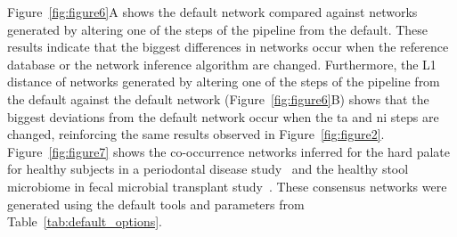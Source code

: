   Figure~\ref{fig:figure6}A shows the default network compared against networks generated by altering one of the steps of the pipeline from the default.
  These results indicate that the biggest differences in networks occur when the reference database or the network inference algorithm are changed.
  Furthermore, the L1 distance of networks generated by altering one of the steps of the pipeline from the default against the default network (Figure~\ref{fig:figure6}B) shows that the biggest deviations from the default network occur when the \ac{ta} and \ac{ni} steps are changed, reinforcing the same results observed in Figure~\ref{fig:figure2}. Figure~\ref{fig:figure7} shows the co-occurrence networks inferred for the hard palate for healthy subjects in a periodontal disease study~\cite{Chen2018} and the healthy stool microbiome in fecal microbial transplant study~\cite{Kang2017}. These consensus networks were generated using the default tools and parameters from Table~\ref{tab:default_options}.
